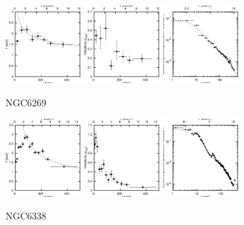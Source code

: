 \documentclass[structabstract]{aa}
\begin{document}
\begin{figure}[h]
   \centering
   \includegraphics[width=0.26\textwidth]{tprofile_ngc6269.eps}
   \includegraphics[width=0.26\textwidth]{zprofile_ngc6269.eps}
   \includegraphics[width=0.26\textwidth]{sbps_ngc6269.eps}
   \caption{NGC6269}
   \label{fig:tprofngc6269}%
\end{figure}
\begin{figure}[h]
   \centering
   \includegraphics[width=0.26\textwidth]{tprofile_ngc6338.eps}
   \includegraphics[width=0.26\textwidth]{zprofile_ngc6338.eps}
   \includegraphics[width=0.26\textwidth]{sbps_ngc6338.eps}
   \caption{NGC6338}
   \label{fig:tprofngc6338}%
\end{figure}
\end{document}
